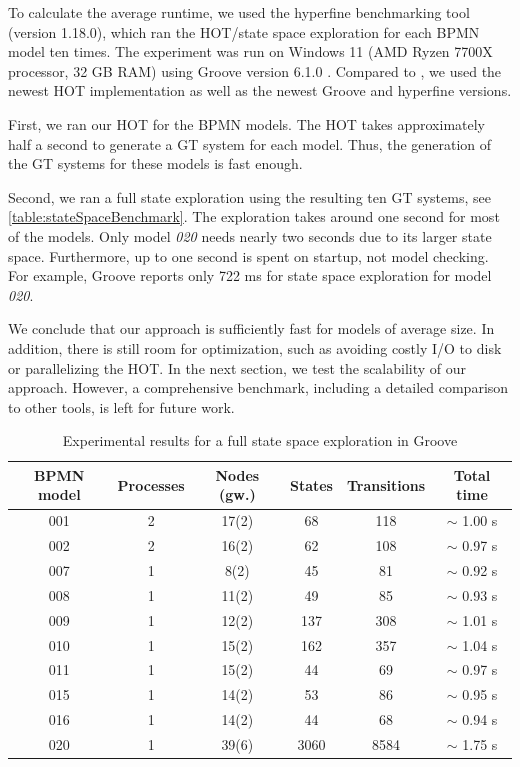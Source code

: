 \documentclass{lmcs} %
\begin{document}
To calculate the average runtime, we used the hyperfine benchmarking tool \cite{peterHyperfine2023} (version 1.18.0), which ran the HOT/state space exploration for each BPMN model ten times.
The experiment was run on Windows 11 (AMD Ryzen 7700X processor, 32 GB RAM) using Groove version 6.1.0 \cite{timkrauterLMCS2024Artifacts2023}.
Compared to \cite{krauterFormalizationAnalysisBPMN2023}, we used the newest HOT implementation as well as the newest Groove and hyperfine versions.

First, we ran our HOT for the BPMN models.
The HOT takes approximately half a second to generate a GT system for each model.
Thus, the generation of the GT systems for these models is fast enough.

Second, we ran a full state exploration using the resulting ten GT systems, see \autoref{table:stateSpaceBenchmark}.
The exploration takes around one second for most of the models.
Only model \textit{020} needs nearly two seconds due to its larger state space.
Furthermore, up to one second is spent on startup, not model checking.
For example, Groove reports only 722 ms for state space exploration for model \textit{020}.

We conclude that our approach is sufficiently fast for models of average size.
In addition, there is still room for optimization, such as avoiding costly I/O to disk or parallelizing the HOT.
In the next section, we test the scalability of our approach.
However, a comprehensive benchmark, including a detailed comparison to other tools, is left for future work.

\begin{table}[ht]
\centering
\caption{Experimental results for a full state space exploration in Groove}

\begin{tabular}{| c | c | c || c | c | c |}
 \hline
 BPMN model & Processes & Nodes (gw.) & States & Transitions & Total time \\
 \hline\hline
 001 & 2 & 17(2) & 68 & 118 & $\sim$ 1.00 s \\
 \hline
 002 & 2 & 16(2) & 62 & 108 & $\sim$ 0.97 s \\
 \hline
 007 & 1 & 8(2) & 45 & 81 & $\sim$ 0.92 s \\
 \hline
 008 & 1 & 11(2) & 49 & 85 & $\sim$ 0.93 s \\
 \hline
 009 & 1 & 12(2) & 137 & 308 & $\sim$ 1.01 s \\
 \hline
 010 & 1 & 15(2) & 162 & 357 & $\sim$ 1.04 s \\
 \hline
 011 & 1 & 15(2) & 44 & 69 & $\sim$ 0.97 s \\
 \hline
 015 & 1 & 14(2) & 53 & 86 & $\sim$ 0.95 s \\
 \hline
 016 & 1 & 14(2) & 44 & 68 & $\sim$ 0.94 s \\
 \hline
 020 & 1 & 39(6) & 3060 & 8584 & $\sim$ 1.75 s \\
 \hline
\end{tabular}
\label{table:stateSpaceBenchmark}
\end{table}
\end{document}
